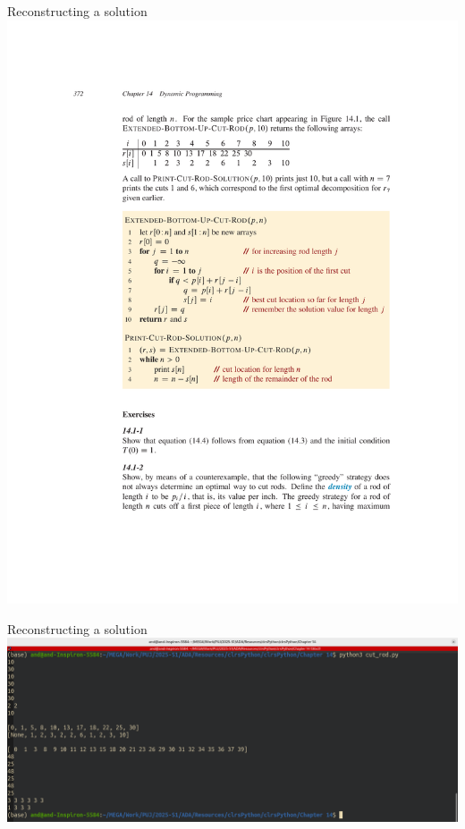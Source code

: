 \documentclass[aspectratio=169]{beamer}
\begin{document}
\begin{frame}{Reconstructing a solution}
    \centering
    \includegraphics[width=\textwidth,clip=true,trim=5cm 13cm 3cm 9cm]{figures/p372}
\end{frame}

\begin{frame}{Reconstructing a solution}
    \centering
    \includegraphics[width=\textwidth]{figures/implementation}
\end{frame}
\end{document}

